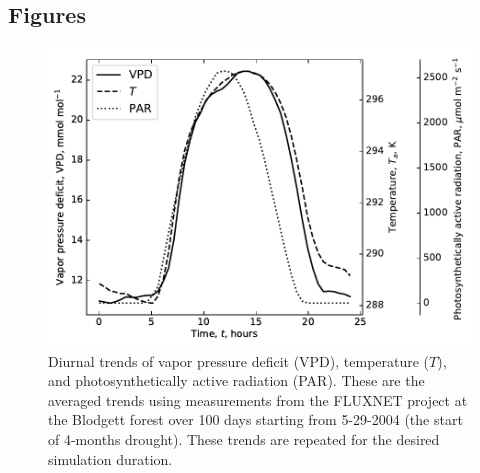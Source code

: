 \documentclass[utf8]{frontiersSCNS} %
\begin{document}







\clearpage

\subsection{Figures}

\begin{figure}[h]
    \begin{center}
         \includegraphics[scale=0.75]{environment.pdf}   
    \end{center}
    \caption{Diurnal trends of vapor pressure deficit (VPD), temperature ($T$), and photosynthetically active radiation (PAR). These are the averaged trends using measurements from the FLUXNET project at the Blodgett forest over 100 days starting from 5-29-2004 (the start of 4-months drought). These trends are repeated for the desired simulation duration.}
    \label{fig:environment}
\end{figure}
\end{document}
